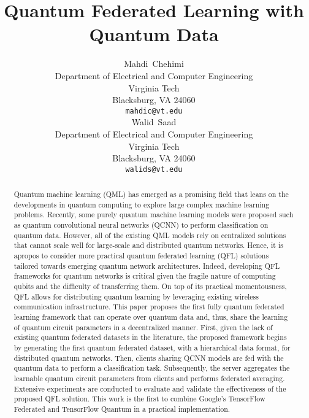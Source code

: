 \documentclass{article}
\title{Quantum Federated Learning with Quantum Data}
\author{
  Mahdi~Chehimi\\
  Department of Electrical and Computer Engineering\\
  Virginia Tech\\
  Blacksburg, VA 24060 \\
  \texttt{mahdic@vt.edu} \\
  \And
  Walid~Saad\\
  Department of Electrical and Computer Engineering\\
  Virginia Tech\\
  Blacksburg, VA 24060 \\
  \texttt{walids@vt.edu} \\

}
\begin{document}
\maketitle

\begin{abstract}
Quantum machine learning (QML) has emerged as a promising field that leans on the developments in quantum computing to explore large complex machine learning problems. Recently, some purely quantum machine learning models were proposed such as quantum convolutional neural networks (QCNN) to perform classification on quantum data. However, all of the existing QML models rely on centralized solutions that cannot scale well for large-scale and distributed quantum networks. Hence, it is apropos to consider more practical quantum federated learning (QFL) solutions tailored towards emerging quantum network architectures. Indeed, developing QFL frameworks for quantum networks is critical given the fragile nature of computing qubits and the difficulty of transferring them. On top of its practical momentousness, QFL allows for distributing quantum learning by leveraging existing wireless communication infrastructure. This paper proposes the first fully quantum federated learning framework that can operate over quantum data and, thus, share the learning of quantum circuit parameters in a decentralized manner. First, given the lack of existing quantum federated datasets in the literature, the proposed framework begins by generating the first quantum federated dataset, with a hierarchical data format, for distributed quantum networks. Then, clients sharing QCNN models are fed with the quantum data to perform a classification task. Subsequently, the server aggregates the learnable quantum circuit parameters from clients and performs federated averaging. Extensive experiments are conducted to evaluate and validate the effectiveness of the proposed QFL solution. This work is the first to combine Google’s TensorFlow Federated and TensorFlow Quantum in a practical implementation.
\end{abstract}
\end{document}
